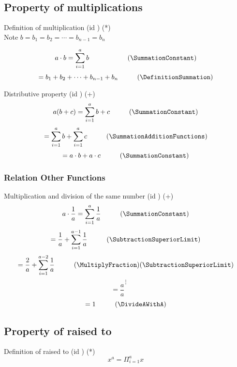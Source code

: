 \documentclass{book}
\begin{document}
            \subsection{Property of multiplications}
                Definition of multiplication (id \DefinitionMultiplication) (*)\\
                
                Note $b = b_1 = b_2 = \cdots = b_{n - 1} = b_n$
                
                \[a \cdot b = \sum^a_{i=1}b \hspace{1cm} \hspace{1cm} (\SummationConstant)\]
                \[= b_1 + b_2 + \cdots + b_{n - 1} + b_n \hspace{1cm} (\DefinitionSummation)\]

                Distributive property (id \DistributiveProperty) (+)
                \[a(b + c) = \sum^a_{i=1} b + c \hspace{1cm} (\SummationConstant)\]
                \[= \sum^a_{i=1} b + \sum^a_{i=1} c \hspace{1cm} (\SummationAdditionFunctions)\]
                \[= a \cdot b + a \cdot c \hspace{1cm} (\SummationConstant)\]

                \subsubsection{Relation Other Functions}
                Multiplication and division of the same number (id \MultiplicationDivisionSame) (+)
                \[a \cdot \frac{1}{a} = \sum^a_{i=1} \frac{1}{a} \hspace{1cm} (\SummationConstant)\]
                \[= \frac{1}{a} + \sum^{a - 1}_{i=1} \frac{1}{a} \hspace{1cm} (\SubtractionSuperiorLimit)\]
                \[= \frac{2}{a} + \sum^{a - 2}_{i=1} \frac{1}{a} \hspace{1cm} (\MultiplyFraction)(\SubtractionSuperiorLimit)\]
                \[\vdots\]
                \[= \frac{a}{a} \hspace{1cm}\]
                \[= 1 \hspace{1cm} (\DivideAWithA)\]

            \subsection{Property of raised to}
                Definition of raised to (id \RaisedToDefinition) (*)
                \[x^a = \Pi^a_{i = 1}x\]
\end{document}
